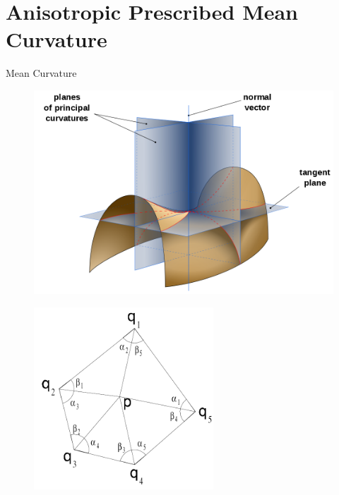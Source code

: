 \documentclass{beamer}
\begin{document}
\section{Anisotropic Prescribed Mean Curvature}

\begin{frame}{Mean Curvature}
\begin{figure}[htbp]
  \begin{minipage}[b]{0.4\linewidth}
    \centering
    \includegraphics[width=\textwidth]{principal_curvature.png}
    \label{fig:curvature}
  \end{minipage}
  \hspace{0.5cm}
  \begin{minipage}[b]{0.4\linewidth}
    \centering
    \includegraphics[width=0.6\textwidth]{cotangent.png}

\end{minipage}
\end{figure}
\end{frame}
\end{document}
